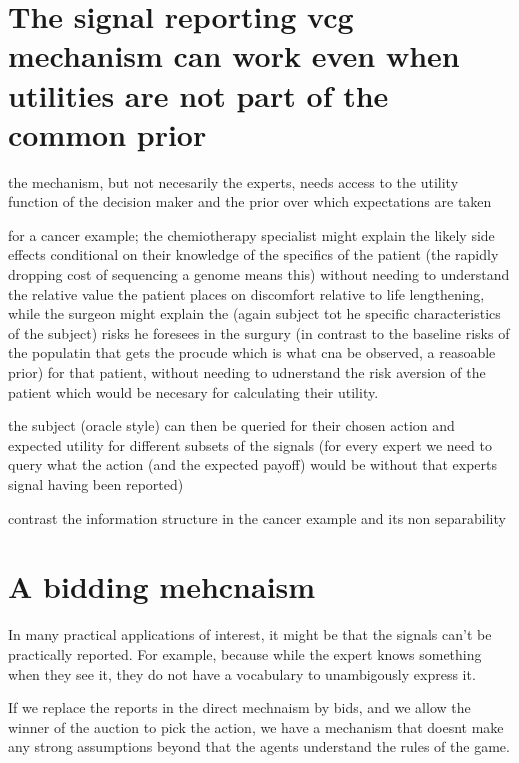 \section{The signal reporting vcg mechanism can work even when utilities are not part of the common prior}

the mechanism, but not necesarily the experts, needs access to the utility function of the decision maker and the prior over which expectations are taken 

for a cancer example; the chemiotherapy specialist might explain the likely side effects conditional on their knowledge of the specifics of the patient (the rapidly dropping cost of sequencing a genome means this) without needing to understand the relative value the patient places on discomfort relative to life lengthening, while the surgeon might explain the (again subject tot he specific characteristics of the subject) risks he foresees in the surgury (in contrast to the baseline risks of the populatin that gets the procude which is what cna be observed, a reasoable prior) for that patient, without needing to udnerstand the risk aversion of the patient which would be necesary for calculating their utility.

the subject (oracle style) can then be queried for their chosen action and expected utility for different subsets of the signals (for every expert we need to query what the action (and the expected payoff) would be without that experts signal having been reported)

contrast the information structure in the cancer example and its non separability 


\section{A bidding mehcnaism }

In many practical applications of interest, it might be that the signals can't be practically reported. For example, because while the expert knows something when they see it, they do not have a vocabulary to unambigously express it. 


If we replace the reports in the direct mechnaism by bids, and we allow the winner of the auction to pick the action, we have a mechanism that doesnt make any strong assumptions beyond that the agents understand the rules of the game.

